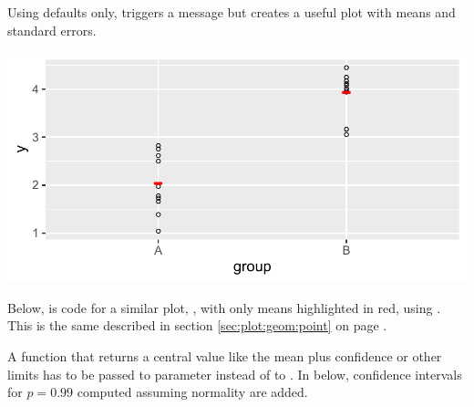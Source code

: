 \documentclass[krantz2]{krantz}\usepackage{knitr}
\begin{document}
Using defaults only, triggers a message but creates a useful plot with means and standard errors.

\begin{knitrout}\footnotesize
{}\color{fgcolor}\begin{kframe}
\begin{alltt}
 \hlopt{+} \hlstd{()}
\end{alltt}


{\ttfamily\noindent\itshape\color{messagecolor}{\#\# No summary function supplied, defaulting to `mean\_se()`}}\end{kframe}

{\centering \includegraphics[width=.7\textwidth]{figure/pos-summary-plot-02-1} 

}


\end{knitrout}



Below, is code for a similar plot, , with only means highlighted in red, using . This is the same  described in section \ref{sec:plot:geom:point} on page \pageref{sec:plot:geom:point}.

\begin{knitrout}\footnotesize
{}\color{fgcolor}\begin{kframe}
\begin{alltt}
 \hlkwb{<-}
   \hlopt{+}
  \hlstd{(} \hlstd{=} \hlstd{,}  \hlstd{=} \hlstd{,}  \hlstd{=} \hlstd{,}  \hlstd{=} \hlstd{,}  \hlstd{=} \hlstd{)}
\end{alltt}
\end{kframe}
\end{knitrout}

A function that returns a central value like the mean plus confidence or other limits has to be passed to parameter  instead of to . In  below, confidence intervals for $p = 0.99$ computed assuming normality are added.
\end{document}
